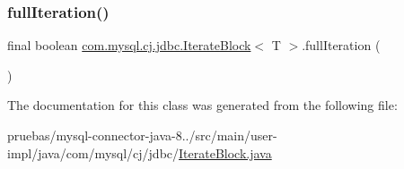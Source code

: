 \subsubsection{\texorpdfstring{full\+Iteration()}{fullIteration()}}
{\footnotesize\ttfamily final boolean \mbox{\hyperlink{classcom_1_1mysql_1_1cj_1_1jdbc_1_1_iterate_block}{com.\+mysql.\+cj.\+jdbc.\+Iterate\+Block}}$<$ T $>$.full\+Iteration (\begin{DoxyParamCaption}{ }\end{DoxyParamCaption})}



The documentation for this class was generated from the following file\+:\begin{DoxyCompactItemize}
\item 
pruebas/mysql-\/connector-\/java-\/8../src/main/user-\/impl/java/com/mysql/cj/jdbc/\mbox{\hyperlink{_iterate_block_8java}{Iterate\+Block.\+java}}\end{DoxyCompactItemize}

